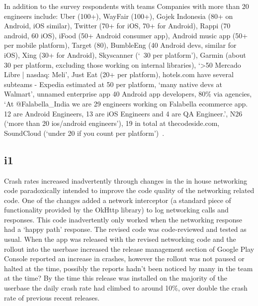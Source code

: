 In addition to the survey respondents with teams Companies with more than 20 engineers include: Uber (100+), %
WayFair (100+), Gojek Indonesia (80+ on Android, iOS similar), %
Twitter (70+ for iOS, 70+ for Android), Rappi (70 android, 60 iOS), iFood (50+ Android consumer app), Android music app (50+ per mobile platform), Target (80), BumbleEng (40 Android devs, similar for iOS), Xing (30+ for Android), Skyscanner (`~30 per platform'), Garmin (about 30 per platform, excluding those working on internal libraries), `>50 Mercado Libre | nasdaq: Meli', Just Eat (20+ per platform), hotels.com have several subteams - Expedia estimated at 50 per platform, `many native devs at Walmart', unnamed enterprise app 40 Android app developers, 80\% via agencies, `At 
@Falabella\_India we are 29 engineers working on Falabella ecommerce app. 12 are Android Engineers, 13 are iOS Engineers and 4 are QA Engineer.', N26 (`more than 20 ios/android engineers'), 19 in total at thecodeside.com, SoundCloud (`under 20 if you count per platform')~\citep{gergelyorosz2021_twitter_mobile_app_poll}.

\subsection{i1}

Crash rates increased inadvertently through changes in the in house networking code paradoxically intended to improve the code quality of the networking related code. One of the changes added a network interceptor (a standard piece of functionality provided by the OkHttp library) to log networking calls and responses. This code inadvertently only worked when the networking response had a `happy path' response. The revised code was code-reviewed and tested as usual. When the app was released with the revised networking code and the rollout into the userbase increased the release management section of Google Play Console reported an increase in crashes, however the rollout was not paused or halted at the time, possibly the reports hadn't been noticed by many in the team at the time? By the time this release was installed on the majority of the userbase the daily crash rate had climbed  to around 10\%, over double the crash rate of previous recent releases.


